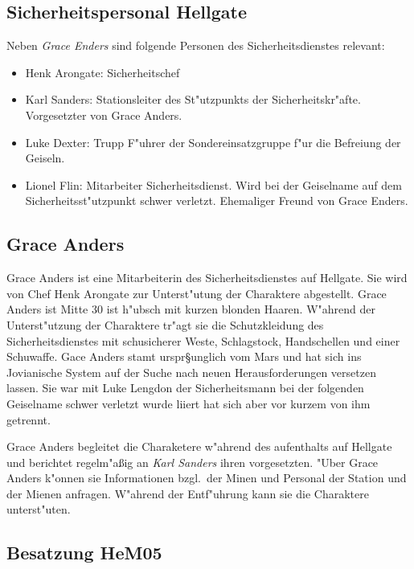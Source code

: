 \subsection{Sicherheitspersonal Hellgate}

Neben \emph{Grace Enders} sind folgende Personen des Sicherheitsdienstes relevant:

\begin{itemize}
    \item Henk Arongate: Sicherheitschef    
    \item Karl Sanders: Stationsleiter des St"utzpunkts der Sicherheitskr"afte. Vorgesetzter von Grace Anders.
    \item Luke Dexter: Trupp F"uhrer der Sondereinsatzgruppe f"ur die Befreiung der Geiseln.
    \item Lionel Flin: Mitarbeiter Sicherheitsdienst. Wird bei der Geiselname auf dem Sicherheitsst"utzpunkt schwer verletzt. Ehemaliger Freund von Grace Enders.
\end{itemize}

\subsection{Grace Anders}

Grace Anders ist eine Mitarbeiterin des Sicherheitsdienstes auf Hellgate. Sie wird von Chef Henk Arongate zur Unterst"utung der Charaktere abgestellt. Grace Anders ist Mitte 30 ist h"ubsch mit kurzen blonden Haaren. W"ahrend der Unterst"utzung der Charaktere tr"agt sie die Schutzkleidung des Sicherheitsdienstes mit schu\3sicherer Weste, Schlagstock, Handschellen und einer Schu\3waffe. Gace Anders stamt urspr§unglich vom Mars und hat sich ins Jovianische System auf der Suche nach neuen Herausforderungen versetzen lassen. Sie war mit Luke Lengdon der Sicherheitsmann bei der folgenden Geiselname schwer verletzt wurde liiert hat sich aber vor kurzem von ihm getrennt.

Grace Anders begleitet die Charaketere w"ahrend des aufenthalts auf Hellgate und berichtet regelm"aßig an \emph{Karl Sanders} ihren vorgesetzten. "Uber Grace Anders k"onnen sie Informationen bzgl.~der Minen und Personal der Station und der Mienen anfragen. W"ahrend der Entf"uhrung kann sie die Charaktere unterst"uten.

\subsection{Besatzung HeM05}

